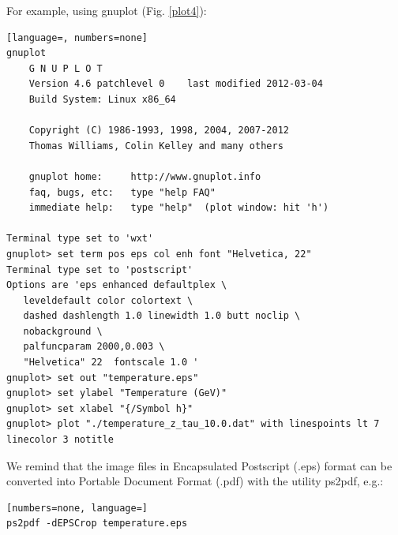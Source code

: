 For example, using gnuplot (Fig. \ref{plot4}):
\begin{lstlisting}[language=, numbers=none]
gnuplot
	G N U P L O T
	Version 4.6 patchlevel 0    last modified 2012-03-04 
	Build System: Linux x86_64

	Copyright (C) 1986-1993, 1998, 2004, 2007-2012
	Thomas Williams, Colin Kelley and many others

	gnuplot home:     http://www.gnuplot.info
	faq, bugs, etc:   type "help FAQ"
	immediate help:   type "help"  (plot window: hit 'h')

Terminal type set to 'wxt'
gnuplot> set term pos eps col enh font "Helvetica, 22"
Terminal type set to 'postscript'
Options are 'eps enhanced defaultplex \
   leveldefault color colortext \
   dashed dashlength 1.0 linewidth 1.0 butt noclip \
   nobackground \
   palfuncparam 2000,0.003 \
   "Helvetica" 22  fontscale 1.0 '
gnuplot> set out "temperature.eps"
gnuplot> set ylabel "Temperature (GeV)"
gnuplot> set xlabel "{/Symbol h}"
gnuplot> plot "./temperature_z_tau_10.0.dat" with linespoints lt 7 linecolor 3 notitle
\end{lstlisting}
We remind that the image files in Encapsulated Postscript (.eps) format can be converted into Portable Document Format (.pdf) with the utility ps2pdf, e.g.:
\begin{lstlisting}[numbers=none, language=]
ps2pdf -dEPSCrop temperature.eps
\end{lstlisting}


